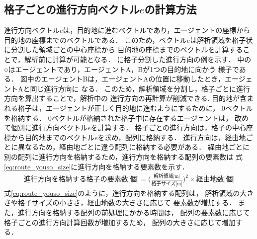 
\subsection{格子ごとの進行方向ベクトル$e$の計算方法}
進行方向ベクトル$e$は，目的地に進むベクトルであり，エージェントの座標から
目的地の座標までのベクトルである．
このため，ベクトル$e$は解析領域を格子状に分割した領域ごとの中心座標から
目的地の座標までのベクトルを計算することで，解析前に計算が可能となる．
に格子分割した進行方向の例を示す．
%
%
中の○はエージェントであり，エージェントA，Bが1つの目的地に向かう
様子である．
図中のエージェントBは，エージェントAの位置に移動したとき，エージェントAと同じ進行方向に
なる．
このため，解析領域を分割し，格子ごとに進行方向を算出することで，解析中の
進行方向の再計算が削減できる.	
目的地が含まれる格子は，エージェントが正しく目的地に進むようにするために，
0ベクトルを格納する．
0ベクトルが格納された格子中に存在するエージェントは，
改めて個別に進行方向ベクトル$e$を計算する．
格子ごとの進行方向は，格子の中心座標から目的地までのベクトル$e$を求め，配列に格納する．
進行方向は，経由地ごとに異なるため，経由地ごとに違う配列に格納する必要がある．
経由地ごとに別の配列に進行方向を格納するため，進行方向を格納する配列の要素数は
式\eqref{eq:route_youso_size}に進行方向を格納する要素数を示す．
%
\begin{eqnarray}
 \mbox{進行方向を格納する格子の要素数[個]} =  \Big( \frac{\mbox{解析領域[m]}}{\mbox{格子サイズ[m]}} \Big) ^ 2 \times  \mbox{経由地数[個]}
 \label{eq:route_youso_size}
\end{eqnarray}
%
式\eqref{eq:route_youso_size}のように，進行方向を格納する配列は，
解析領域の大きさや格子サイズの小ささ，経由地数の大きさに応じて
要素数が増加する．
また，進行方向を格納する配列の前処理にかかる時間は，
配列の要素数に応じて格子ごとの進行方向計算回数が増加するため，
配列の大きさに応じて増加する．



